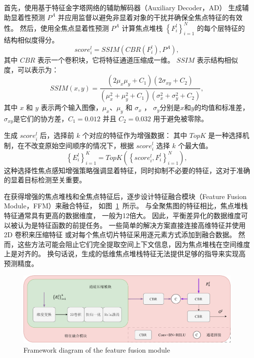 首先，使用基于特征金字塔网络的辅助解码器（Auxiliary Decoder，AD）
生成辅助显着性预测 $ P^{A} $ 并应用监督以避免非显着对象的干扰并确保全焦点特征的有效性。 
然后，使用全焦点显着性预测 $ P^{A} $ 计算焦点堆栈 $ \left \{ F_{i}^{l} \right \}_{i=1}^{N} $ 的每个层特征的结构相似度得分。 
\begin{equation}
	score_{i}^{l} = SSIM \left ( CBR \left ( F_{i}^{l} \right ), P^{A} \right ),
\end{equation}
%
%
其中 $CBR$ 表示一个卷积块，它将特征通道压缩成一维。 $SSIM$ 表示结构相似度，可以表示为： 
%
%
\begin{equation} 	
	SSIM(x,y)=\frac{\left ( 2\mu_{x}\mu_{y}+C_{1} \right ) \left (  2\sigma_{xy}+C_{2} \right )  } 	
	{\left ( \mu_{x}^{2} + \mu_{y}^{2}+C_{1}\right ) \left ( \sigma_{x}^{2}+ \sigma_{y}^{2} + C_{2} \right ) } , 	
\end{equation}
其中 $x$ 和 $y$ 表示两个输入图像，$\mu_{x}$、$\mu_{y}$ 和 $\sigma_{x}$ ， $\sigma_{y}$分别是$x$和$y$的均值和标准差，$\sigma_{xy}$是它们的协方差，$C_{1} = 0.012$ 并且 $C_{2} = 0.032$ 用于避免被零除。 
%
%
%
%
\par
%
%
生成 $ score_{i}^{l} $ 后，选择前 $k$ 个对应的特征作为增强数据：
其中 $ TopK $ 是一种选择机制，在不改变原始空间顺序的情况下，根据 $ score_{i}^{l} $ 选择 $k$ 个最大值。 
\begin{equation}
	\left \{ E_{i}^{l} \right \}_{i=1}^{K} = TopK \left ( \left \{ score_{i}^{l}, F_{i}^{l} \right \}_{i=1}^{N} \right ), 	
\end{equation}
%
%
这种选择性焦点感知增强策略强调显着特征，同时抑制不必要的特征，这对于准确的显着目标检测至关重要。
%
%
%
%
\par
%
%
在获得增强的焦点堆栈和全焦点特征后，逐步设计特征融合模块（Feature Fusion Module，FFM）来融合特征，
如图~\ref{cpt3_fig1:ccm}~所示。
与全聚焦图的特征相比，焦点堆栈特征通常具有更高的数据维度， 一般为12倍大。 
因此，平衡差异化的数据维度可以被认为是特征函数的前提任务。
一些简单的解决方案直接连接高维特征并使用 2D 卷积来压缩特征
或对每个焦点切片特征采用逐元素方式添加到融合数据。 然而，这些方法可能会阻止它们完全提取空间上下文信息，因为焦点堆栈在空间维度上是对齐的。 换句话说，生成的低维焦点堆栈特征无法提供足够的指导来实现高预测精度。 





\begin{figure}[!ht]
	\centering
	\includegraphics[width=0.95\linewidth]{figures/chapter3/ccm}
	{Framework diagram of the feature fusion module}
	\label{cpt3_fig1:ccm}
\end{figure}




